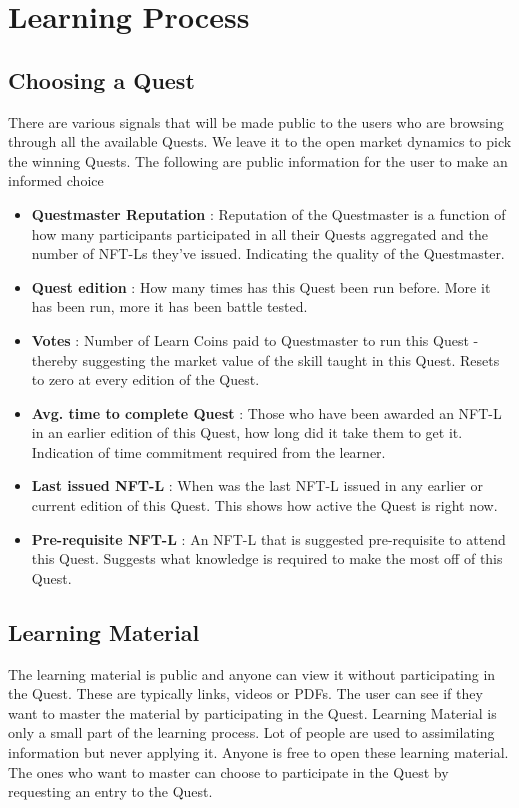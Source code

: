 \documentclass{article}
\begin{document}
  \section{Learning Process}
    \subsection{Choosing a Quest}
        There are various signals that will be made public to the users who are browsing through all the available Quests. We leave it to the open market dynamics to pick the winning Quests.
        The following are public information for the user to make an informed choice
        \begin{itemize}
          \item \textbf{Questmaster Reputation }: Reputation of the Questmaster is a function of how many participants participated in all their Quests aggregated and the number of NFT-Ls they've issued. Indicating the quality of the Questmaster.
          \item \textbf{Quest edition }: How many times has this Quest been run before. More it has been run, more it has been battle tested.
          \item \textbf{Votes }: Number of Learn Coins paid to Questmaster to run this Quest - thereby suggesting the market value of the skill taught in this Quest. Resets to zero at every edition of the Quest.
          \item \textbf{Avg. time to complete Quest }: Those who have been awarded an NFT-L in an earlier edition of this Quest, how long did it take them to get it. Indication of time commitment required from the learner. 
          \item \textbf{Last issued NFT-L }:  When was the last NFT-L issued in any earlier or current edition of this Quest. This shows how active the Quest is right now. 
          \item \textbf{Pre-requisite NFT-L }: An NFT-L that is suggested pre-requisite to attend this Quest. Suggests what knowledge is required to make the most off of this Quest.
        \end{itemize}
    \subsection{Learning Material}
        The learning material is public and anyone can view it without participating in the Quest. 
        These are typically links, videos or PDFs. The user can see if they want to master the material by participating in the Quest. 
        Learning Material is only a small part of the learning process. Lot of people are used to assimilating information but never applying it. 
        Anyone is free to open these learning material. The ones who want to master can choose to participate in the Quest by requesting an entry to the Quest.
\end{document}

